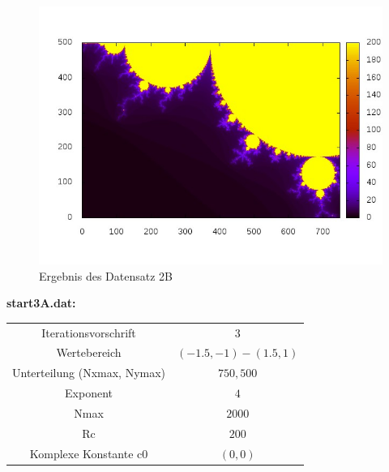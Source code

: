 \documentclass{report}
\begin{document}
\begin{figure}[h]
    \includegraphics[scale=0.7]{ergebnis2B}
    \caption{Ergebnis des Datensatz 2B}
    \label{fig:ergebnis2B} %
\end{figure}


\clearpage{}
\textbf{start3A.dat:}

\begin{center}
\begin{tabular}{c|c}
Iterationsvorschrift & $3$ \\
\cline{1-2}
Wertebereich & $(-1.5, -1) - (1.5, 1)$ \\
\cline{1-2}
Unterteilung (Nxmax, Nymax) & $750, 500$ \\
\cline{1-2}
Exponent & $4$  \\
\cline{1-2}
Nmax & $2000$ \\
\cline{1-2}
Rc & $200$ \\
\cline{1-2}
Komplexe Konstante c0 & $(0, 0)$ \\
\cline{1-2}
\end{tabular}
\label{tab:resA2_5}
\end{center}
\end{document}
